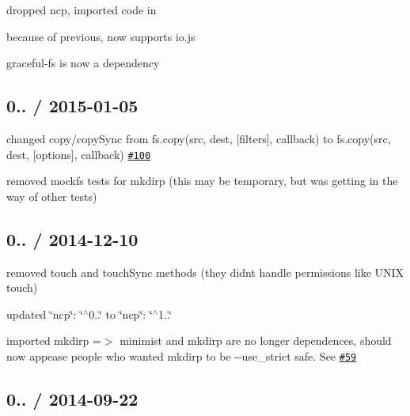 \begin{DoxyItemize}
\item dropped {\ttfamily ncp}, imported code in
\item because of previous, now supports {\ttfamily io.\+js}
\item {\ttfamily graceful-\/fs} is now a dependency
\end{DoxyItemize}

\subsection*{0.. / 2015-\/01-\/05 }


\begin{DoxyItemize}
\item changed {\ttfamily copy}/{\ttfamily copy\+Sync} from {\ttfamily fs.\+copy(src, dest, \mbox{[}filters\mbox{]}, callback)} to {\ttfamily fs.\+copy(src, dest, \mbox{[}options\mbox{]}, callback)} \href{https://github.com/jprichardson/node-fs-extra/pull/100}{\tt \#100}
\item removed mockfs tests for mkdirp (this may be temporary, but was getting in the way of other tests)
\end{DoxyItemize}

\subsection*{0.. / 2014-\/12-\/10 }


\begin{DoxyItemize}
\item removed {\ttfamily touch} and {\ttfamily touch\+Sync} methods (they didn\textquotesingle{}t handle permissions like U\+N\+IX touch)
\item updated {\ttfamily \char`\"{}ncp\char`\"{}\+: \char`\"{}$^\wedge$0..\char`\"{}} to {\ttfamily \char`\"{}ncp\char`\"{}\+: \char`\"{}$^\wedge$1..\char`\"{}}
\item imported {\ttfamily mkdirp} =$>$ {\ttfamily minimist} and {\ttfamily mkdirp} are no longer dependences, should now appease people who wanted {\ttfamily mkdirp} to be {\ttfamily -\/-\/use\+\_\+strict} safe. See \href{[#59][#59]}{\tt \#59}
\end{DoxyItemize}

\subsection*{0.. / 2014-\/09-\/22 }


